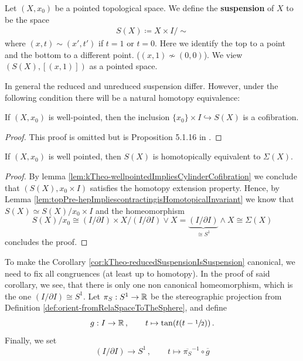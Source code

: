 \begin{definition}
	Let $(X,x_0)$ be a pointed topological space. We define the \textbf{suspension} of $X$ to be the space
	\begin{eqnarray}
		S(X)\coloneq X\times I \big/ \sim
	\end{eqnarray} where $(x,t)\sim(x',t')$ if $t=1$ or $t=0$. Here we identify the top to a point and the bottom to a different point. ($(x,1)\nsim (0,0)$). We view $(S(X),[(x,1)])$ as a pointed space.
\end{definition}
In general the reduced and unreduced suspension differ. However, under the following condition there will be a natural homotopy equivalence:
\begin{lemma}\label{lem:kTheo-wellpointedImpliesCylinderCofibration}
If $(X,x_0)$ is well-pointed, then the inclusion 
$\{x_0\}\times I \hookrightarrow S(X)$ is a cofibration.
\end{lemma}
\begin{proof}
This proof is omitted but is Proposition 5.1.16 in \cite{tomdieck2008algebraic}.
\end{proof}
\begin{corollary} \label{cor:kTheo-reducedSuspensionIsSuspension}
	If $(X,x_0)$ is well pointed, then $S(X)$ is homotopically equivalent to $\Sigma(X)$. 
\end{corollary}
\begin{proof}
	By lemma \ref{lem:kTheo-wellpointedImpliesCylinderCofibration} we conclude that $(S(X),{x_0}\times I)$ satisfies the homotopy extension property. Hence, by Lemma \ref{lem:topPre-hepImpliescontractingisHomotopicalInvariant} we know that 
	$S(X)\simeq S(X)\big/ {x_0}\times I$ and the homeomorphism
	\begin{equation*}
		S(X)\big/{x_0}\cong (I/\partial I)\times X \big/ (I/\partial I) \vee X = \underbrace{(I/\partial I)}_{\cong S^1}\wedge X \cong \Sigma(X)
	\end{equation*} concludes the proof.
\end{proof}
\begin{definition}[Convention]
	To make the Corollary \ref{cor:kTheo-reducedSuspensionIsSuspension} canonical, we need to fix all congruences (at least up to homotopy). In the proof of said corollary, we see, that there is only one non canonical homeomorphism, which is the one $(I/\partial I)\cong S^1$. Let $\pi_S:S^1\to \mathbb{R}$ be the stereographic projection from Definition \ref{def:orient-fromRelaSpaceToTheSphere}, and define
	\begin{equation*}
		g: I \to \mathbb{R}\,,\qquad t\mapsto \tan(t(t-\sfrac{1}{2}))\,.
	\end{equation*}
	Finally, we set 
	\begin{equation*}
		(I/\partial I)\to S^1\,,\qquad t\mapsto \overline{\pi_S}^{-1}\circ \overline{g}
	\end{equation*}
\end{definition}
